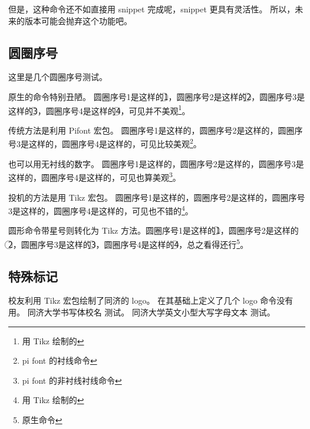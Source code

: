 \documentclass[../Main/thesis]{subfiles}
\begin{document}
但是，这种命令还不如直接用 snippet 完成呢，snippet 更具有灵活性。
所以，未来的版本可能会抛弃这个功能吧。

\subsection{圆圈序号}
这里是几个圆圈序号测试。

原生的命令特别丑陋。
圆圈序号1是这样的\textcircled{1}，圆圈序号2是这样的\textcircled{2}，圆圈序号3是这样的\textcircled{3}，圆圈序号4是这样的\textcircled{4}，可见并不美观\footnote{用 Tikz 绘制的}。

传统方法是利用 Pifont 宏包。
圆圈序号1是这样的，圆圈序号2是这样的，圆圈序号3是这样的，圆圈序号4是这样的，可见比较美观\footnote{pi font 的衬线命令}。

也可以用无衬线的数字。
圆圈序号1是这样的，圆圈序号2是这样的，圆圈序号3是这样的，圆圈序号4是这样的，可见也算美观\footnote{pi font 的非衬线衬线命令}。

投机的方法是用 Tikz 宏包。
圆圈序号1是这样的，圆圈序号2是这样的，圆圈序号3是这样的，圆圈序号4是这样的，可见也不错的\footnote{用 Tikz 绘制的}。

圆形命令带星号则转化为 Tikz 方法。圆圈序号1是这样的\textcircled*{1}，圆圈序号2是这样的\textcircled*{2}，圆圈序号3是这样的\textcircled*{3}，圆圈序号4是这样的\textcircled*{4}，总之看得还行\footnote{原生命令}。

\subsection{特殊标记}
校友利用 Tikz 宏包绘制了同济的 logo。
在其基础上定义了几个 logo 命令没有用。
同济大学书写体校名 \tongjiname 测试。
同济大学英文小型大写字母文本 \tongjithesis 测试。
\end{document}
